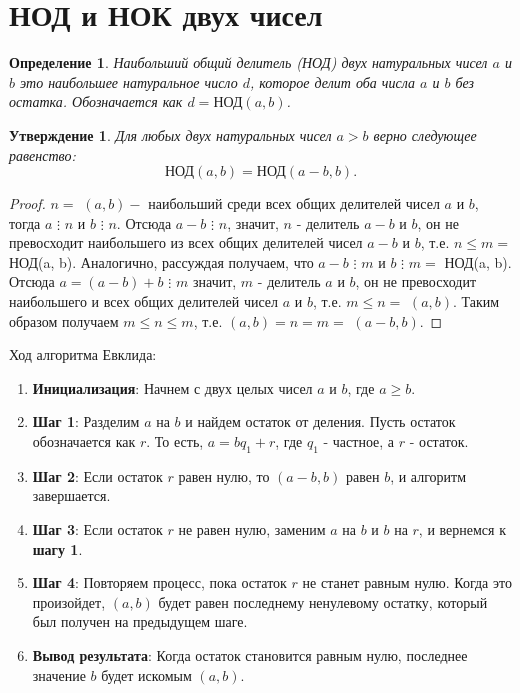 \documentclass[12pt, a4paper, openany]{book}
\newtheorem*{definition}{Определение}
\newtheorem*{statement}{Утверждение}
\begin{document}
\newpage
\section{НОД и НОК двух чисел}

\begin{definition}
Наибольший общий делитель (НОД) двух натуральных чисел \(a\) и \(b\) это наибольшее натуральное число \(d\), которое делит оба числа \(a\) и \(b\) без остатка. Обозначается как \(d = \text{НОД}(a, b)\).
\end{definition}

\begin{statement}
Для любых двух натуральных чисел $a > b$ верно следующее равенство:
\begin{equation*}
\text{НОД}(a, b) = \text{НОД}(a - b, b).
\end{equation*}
\end{statement}

\begin{proof}
$n=$ $(a, b) - $ наибольший среди всех общих делителей чисел $a$ и $b$, тогда $a$ $\vdots$ $n$ и $b$ $\vdots$ $n$.
Отсюда $a-b$ $\vdots$ $n$, значит, $n$ - делитель $a-b$ и $b$, он не превосходит наибольшего из всех общих делителей чисел $a-b$ и $b$, т.е. $n \leqslant m=$ $\text{НОД}$(a, b). Аналогично, рассуждая получаем, что $a-b$ $\vdots$ $m$ и $b$ $\vdots$ $m=$ $\text{НОД}$(a, b). Отсюда $a=(a-b)+b$ $\vdots$ $m$ значит, $m$ - делитель $a$ и $b$, он не превосходит наибольшего и всех общих делителей чисел $a$ и $b$, т.е. $m \leqslant n=$ $(a, b)$. Таким образом получаем $m \leqslant n \leqslant m$, т.е. $(a, b)=n=m=$ $(a-b, b)$.
\end{proof}

\noindent
Ход алгоритма Евклида:

\begin{enumerate}
  \item \textbf{Инициализация}: Начнем с двух целых чисел $a$ и $b$, где $a \geq b$.
  
  \item \textbf{Шаг 1}: Разделим $a$ на $b$ и найдем остаток от деления. Пусть остаток обозначается как $r$. То есть, $a = bq_1 + r$, где $q_1$ - частное, а $r$ - остаток.
  
  \item \textbf{Шаг 2}: Если остаток $r$ равен нулю, то $(a-b, b)$ равен $b$, и алгоритм завершается.
  
  \item \textbf{Шаг 3}: Если остаток $r$ не равен нулю, заменим $a$ на $b$ и $b$ на $r$, и вернемся к \textbf{шагу 1}.
  
  \item \textbf{Шаг 4}: Повторяем процесс, пока остаток $r$ не станет равным нулю. Когда это произойдет, $(a, b)$ будет равен последнему ненулевому остатку, который был получен на предыдущем шаге.
  
  \item \textbf{Вывод результата}: Когда остаток становится равным нулю, последнее значение $b$ будет искомым $(a, b)$.
\end{enumerate}
\end{document}
